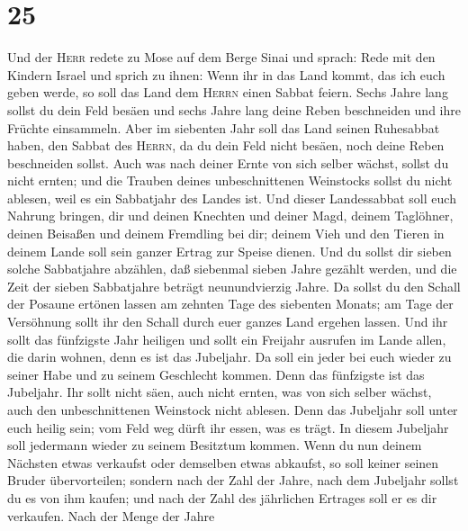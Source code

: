 \hypertarget{section-24}{%
\section{25}\label{section-24}}

 Und der \textsc{Herr} redete zu Mose auf dem Berge Sinai
und sprach:  Rede mit den Kindern Israel und sprich zu
ihnen: Wenn ihr in das Land kommt, das ich euch geben werde, so soll das
Land dem \textsc{Herrn} einen Sabbat feiern.  Sechs Jahre
lang sollst du dein Feld besäen und sechs Jahre lang deine Reben
beschneiden und ihre Früchte einsammeln.  Aber im
siebenten Jahr soll das Land seinen Ruhesabbat haben, den Sabbat des
\textsc{Herrn}, da du dein Feld nicht besäen, noch deine Reben
beschneiden sollst.  Auch was nach deiner Ernte von sich
selber wächst, sollst du nicht ernten; und die Trauben deines
unbeschnittenen Weinstocks sollst du nicht ablesen, weil es ein
Sabbatjahr des Landes ist.  Und dieser Landessabbat soll
euch Nahrung bringen, dir und deinen Knechten und deiner Magd, deinem
Taglöhner, deinen Beisaßen und deinem Fremdling bei dir; 
deinem Vieh und den Tieren in deinem Lande soll sein ganzer Ertrag zur
Speise dienen.  Und du sollst dir sieben solche
Sabbatjahre abzählen, daß siebenmal sieben Jahre gezählt werden, und die
Zeit der sieben Sabbatjahre beträgt neunundvierzig Jahre. 
Da sollst du den Schall der Posaune ertönen lassen am zehnten Tage des
siebenten Monats; am Tage der Versöhnung sollt ihr den Schall durch euer
ganzes Land ergehen lassen.  Und ihr sollt das fünfzigste
Jahr heiligen und sollt ein Freijahr ausrufen im Lande allen, die darin
wohnen, denn es ist das Jubeljahr. Da soll ein jeder bei euch wieder zu
seiner Habe und zu seinem Geschlecht kommen.  Denn das
fünfzigste ist das Jubeljahr. Ihr sollt nicht säen, auch nicht ernten,
was von sich selber wächst, auch den unbeschnittenen Weinstock nicht
ablesen.  Denn das Jubeljahr soll unter euch heilig sein;
vom Feld weg dürft ihr essen, was es trägt.  In diesem
Jubeljahr soll jedermann wieder zu seinem Besitztum kommen.
 Wenn du nun deinem Nächsten etwas verkaufst oder
demselben etwas abkaufst, so soll keiner seinen Bruder übervorteilen;
 sondern nach der Zahl der Jahre, nach dem Jubeljahr
sollst du es von ihm kaufen; und nach der Zahl des jährlichen Ertrages
soll er es dir verkaufen.  Nach der Menge der Jahre
